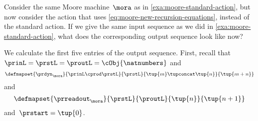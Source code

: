 \begin{example}
    \label{exa:moore-non-standard-action-on-sequences}
    Consider the same Moore machine~$\mora$ as in \cref{exa:moore-standard-action}, but now consider the action that uses \cref{eq:moore-new-recursion-equations}, instead of the standard action.
    If we give the same input sequence as we did in \cref{exa:moore-standard-action}, what does the corresponding output sequence look like now?

    We calculate the first five entries of the output sequence.
    First, recall that~$\prinL = \prstL = \proutL = \cObj{\natnumbers}$ and
    \begin{equation}
        \defmapset{
            \prdyn_\mora
        }{
            \prinL \cprod \prstL
        }{
            \prstL
        }{
            \tup{m} \tupconcat \tup{n}
        }{
            \tup{m + n}
        }
    \end{equation}
    and
    \begin{equation}
        \defmapset{
            \prreadout_\mora
        }{
            \prstL
        }{
            \proutL
        }{
            \tup{n}
        }{
            \tup{n+1}
        }
    \end{equation}
    and~$\prstart = \tup{0}$.


\end{example}
